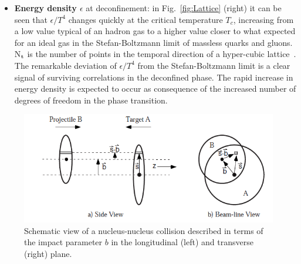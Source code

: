 \begin{itemize}
\item \textbf{Energy density $\epsilon$} at deconfinement: 
in Fig.~\ref{fig:Lattice} (right) it 
can be seen that $\epsilon/T^4$ changes quickly at the critical temperature 
$T_c$, increasing from a low 
value typical of an hadron gas to a higher value closer to what expected 
for an ideal gas in the Stefan-Boltzmann limit of 
massless quarks and gluons. N$_{\rm t}$ is the number of points in the temporal
direction of a hyper-cubic lattice~\cite{Borsanyi:2010cj}. The 
remarkable deviation of $\epsilon/T^4$ from the
Stefan-Boltzmann limit is a clear signal of surviving
correlations in the deconfined phase.
The rapid increase in energy density is expected to occur as consequence of the increased number of degrees of 
freedom in the phase transition. %

\end{itemize}


\begin{figure}[!b]
  \centering
  \includegraphics[width=12cm]{FigCap1/glauber.png}
  \caption{Schematic view of a nucleus-nucleus collision described in terms of the impact parameter $b$ in the longitudinal (left) and transverse (right) plane.}
  \label{fig:image10}
\end{figure}

